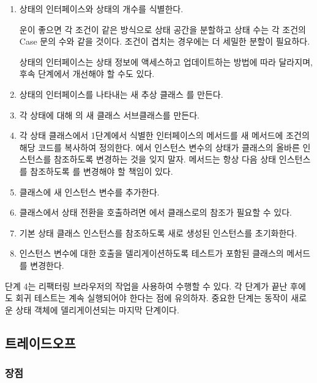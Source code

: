 \documentclass[a4paper,10pt,twoside]{book}
\begin{document}
\begin{enumerate}
\item 상태의 인터페이스와 상태의 개수를 식별한다.

운이 좋으면 각 조건이 같은 방식으로 상태 공간을 분할하고 상태 수는 각 조건의 Case 문의 수와 같을 것이다. 조건이 겹치는 경우에는 더 세밀한 분할이 필요하다.

상태의 인터페이스는 상태 정보에 액세스하고 업데이트하는 방법에 따라 달라지며, 후속 단계에서 개선해야 할 수도 있다.

\item 상태의 인터페이스를 나타내는 새 추상 클래스 를 만든다.

\item 각 상태에 대해 의 새 클래스 서브클래스를 만든다.

\item 각 상태 클래스에서 1단계에서 식별한 인터페이스의 메서드를 새 메서드에 조건의 해당 코드를 복사하여 정의한다. 에서 인스턴스 변수의 상태가  클래스의 올바른 인스턴스를 참조하도록 변경하는 것을 잊지 말자.  메서드는 항상 다음 상태 인스턴스를 참조하도록 를 변경해야 할 책임이 있다. 

\item {} 클래스에 새 인스턴스 변수를 추가한다.

\item {} 클래스에서 상태 전환을 호출하려면 에서  클래스로의 참조가 필요할 수 있다.

\item 기본 상태 클래스 인스턴스를 참조하도록 새로 생성된 인스턴스를 초기화한다.

\item 인스턴스 변수에 대한 호출을 델리게이션하도록 테스트가 포함된  클래스의 메서드를 변경한다.
\end{enumerate}

단계 4는 리팩터링 브라우저의  작업을 사용하여 수행할 수 있다. 각 단계가 끝난 후에도 회귀 테스트는 계속 실행되어야 한다는 점에 유의하자. 중요한 단계는 동작이 새로운 상태 객체에 델리게이션되는 마지막 단계이다.

\subsection*{트레이드오프}

\subsubsection*{장점}
\end{document}
